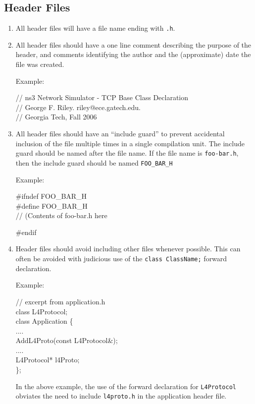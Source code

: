 \documentclass[11pt]{article}
\newcommand{\code}[1]{\texttt{#1}}
\begin{document}
\subsection{Header Files}
\begin{enumerate}
\item All header files will have a file name ending with {\tt .h}.
\item All header files should have a one line comment describing
the purpose of the header, and comments identifying the
author and the (approximate) date the file was created.

Example:

\begin{tt}
// ns3 Network Simulator - TCP Base Class Declaration \\
// George F. Riley.  riley@ece.gatech.edu. \\
// Georgia Tech, Fall 2006
\end{tt}

\item All header files should have an ``include guard'' to prevent accidental
inclusion of the file multiple times in a single compilation unit. The include
guard should be named after the file name. If the file name is \code{foo-bar.h}, then the
include guard should be named \code{FOO\_BAR\_H}

Example:

\begin{tt}
\#ifndef FOO\_BAR\_H  \\
\#define FOO\_BAR\_H \\

// (Contents of foo-bar.h here

\#endif
\end{tt}
\item Header files should avoid including other files whenever possible.
This can often be avoided with judicious use of the
{\tt class ClassName;} forward declaration.  

Example:

\begin{tt}
// excerpt from application.h \\
class L4Protocol; \\

class Application \{ \\
 .... \\
 AddL4Proto(const L4Protocol\&); \\
 .... \\
 L4Protocol* l4Proto; \\
\};
\end{tt}

In the above example, the use of the forward declaration for {\tt L4Protocol}
obviates the need to include {\tt l4proto.h} in the application header
file.

\end{enumerate}
\end{document}

